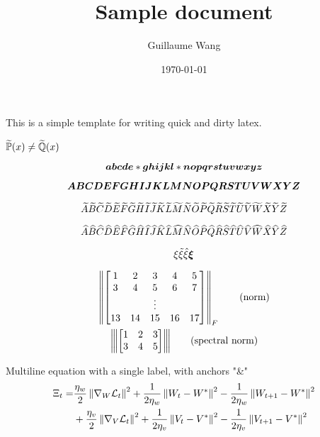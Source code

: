 \documentclass{article}
\title{Sample document}
\date{\today}
\author{Guillaume Wang}
\begin{document}
\maketitle

This is a simple template for writing quick and dirty latex.


\TODO{}

$\tPP(x) \neq \tQQ(x)$

\begin{equation}
	\ba \bb \bc \bd \be * \bg \bh \bi \bj \bk \bl * \bn \bo \bp \bq \br \bs \bt \bu \bv \bw \bx \by \bz
\end{equation}

\begin{equation}
	\bA \bB \bC \bD \bE \bF \bG \bH \bI \bJ \bK \bL \bM \bN \bO \bP \bQ \bR \bS \bT \bU \bV \bW \bX \bY \bZ
\end{equation}

\begin{equation}
	\tA \tB \tC \tD \tE \tF \tG \tH \tI \tJ \tK \tL \tM \tN \tO \tP \tQ \tR \tS \tT \tU \tV \tW \tX \tY \tZ
\end{equation}

\begin{equation}
	\hA \hB \hC \hD \hE \hF \hG \hH \hI \hJ \hK \hL \hM \hN \hO \hP \hQ \hR \hS \hT \hU \hV \hW \hX \hY \hZ
\end{equation}

\begin{equation}
	\xi \txi \hxi \bxi
\end{equation}

\begin{gather}
    \norm{
    \begin{bmatrix}
        1 & 2 & 3 & 4 & 5 \\
        3 & 4 & 5 & 6 & 7 \\
        && \vdots && \\
        13 & 14 & 15 & 16 & 17 \\
    \end{bmatrix}
    }_F \label{eq:norm} \tag{norm} \\
    \spnorm{
    \begin{bmatrix}
        1 & 2 & 3 \\
        3 & 4 & 5
    \end{bmatrix}
    } \label{eq:spnorm} \tag{spectral norm}
\end{gather}

Multiline equation with a single label, with anchors "\&"
\begin{equation}
\begin{split}
    \Xi_t =& \frac{\eta_w}{2}\norm{\nabla_{W} \LLL_t}^2 + \frac{1}{2\eta_w}\norm{W_t - W^*}^2 - \frac{1}{2\eta_w}\norm{W_{t+1} - W^*}^2 \\ 
    &+ \frac{\eta_v}{2}\norm{\nabla_{V} \LLL_t}^2 + \frac{1}{2\eta_v}\norm{V_t - V^*}^2 - \frac{1}{2\eta_v}\norm{V_{t+1} - V^*}^2 
\end{split}
\end{equation}
\end{document}
